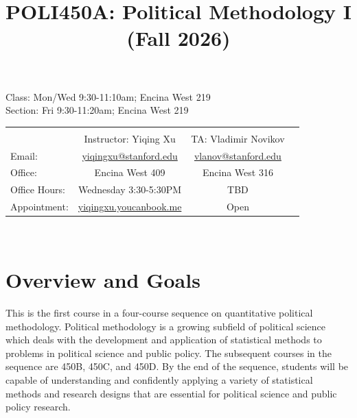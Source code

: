 \documentclass[PS]{syllabus}
\newif\ifrelease
\begin{document}
\title{\bf POLI450A: Political Methodology I \\
\Large{(Fall 2026)}}

\ifrelease
\name{Yiqing Xu, Stanford University}
\else
{}
\fi

\begin{syllabus}
\vspace{-0.5 in}

\ifrelease\else
\begin{center}
Class:    Mon/Wed 9:30-11:10am; Encina West 219  \\
Section:  Fri 9:30-11:20am; Encina West 219
\end{center}

\begin{center}

\begin{tabular}{lccc}
& &  \\
&  Instructor: Yiqing Xu & TA: Vladimir Novikov  \\
Email: & \href{mailto:yiqingxu@stanford.edu}{yiqingxu@stanford.edu} & \href{mailto:vlanov@stanford.edu}{vlanov@stanford.edu}  \\
Office: & Encina West 409 &  Encina West 316  \\
Office Hours:  &  Wednesday 3:30-5:30PM & TBD  \\
Appointment: & \href{https://yiqingxu.youcanbook.me}{yiqingxu.youcanbook.me} & Open   \\
\end{tabular}\\
\end{center}
\fi

\section*{Overview and Goals}

This is the first course in a four-course sequence on quantitative political methodology. Political methodology is a growing subfield of political science which deals with the development and application of statistical methods to problems in political science and public policy. The subsequent courses in the sequence are 450B, 450C, and 450D. By the end of the sequence, students will be capable of understanding and confidently applying a variety of statistical methods and research designs that are essential for political science and public policy research.\\


\end{syllabus}
\end{document}
